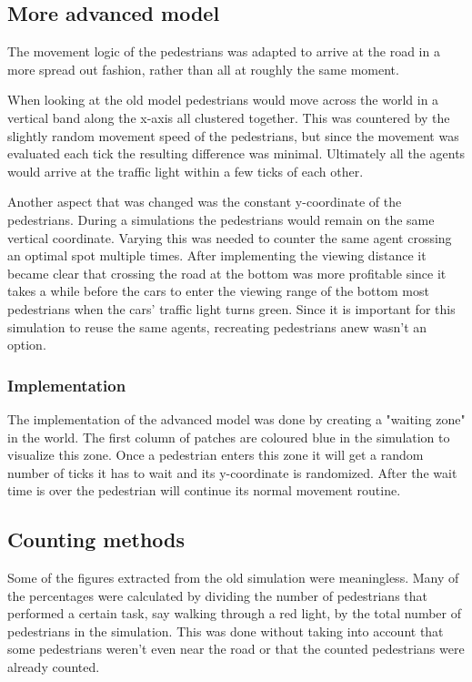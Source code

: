 \documentclass[a4paper]{article}
\begin{document}
\subsection{More advanced model}
The movement logic of the pedestrians was adapted to arrive at the road in a more spread out fashion, rather than all at roughly the same moment.

When looking at the old model pedestrians would move across the world in a vertical band along the x-axis all clustered together. This was countered by the slightly random movement speed of the pedestrians, but since the movement was evaluated each tick the resulting difference was minimal. Ultimately all the agents would arrive at the traffic light within a few ticks of each other.

Another aspect that was changed was the constant y-coordinate of the pedestrians. During a simulations the pedestrians would remain on the same vertical coordinate. Varying this was needed to counter the same agent crossing an optimal spot multiple times. After implementing the viewing distance it became clear that crossing the road at the bottom was more profitable since it takes a while before the cars to enter the viewing range of the bottom most pedestrians when the cars' traffic light turns green.
Since it is important for this simulation to reuse the same agents, recreating pedestrians anew wasn't an option.

\subsubsection{Implementation}
The implementation of the advanced model was done by creating a "waiting zone" in the world. The first column of patches are coloured blue in the simulation to visualize this zone. Once a pedestrian enters this zone it will get a random number of ticks it has to wait and its y-coordinate is randomized.
After the wait time is over the pedestrian will continue its normal movement routine.

\subsection{Counting methods}
Some of the figures extracted from the old simulation were meaningless. Many of the percentages were calculated by dividing the number of pedestrians that performed a certain task, say walking through a red light, by the total number of pedestrians in the simulation. This was done without taking into account that some pedestrians weren't even near the road or that the counted pedestrians were already counted.
\end{document}
